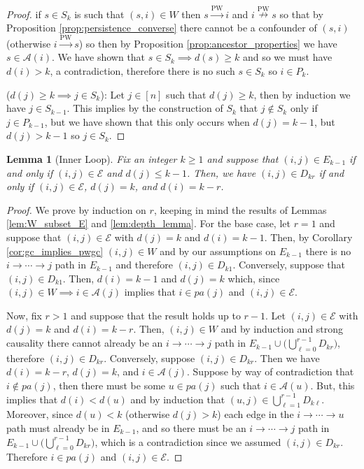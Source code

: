\documentclass{statsoc}
\newcounter{lemma}
\def\pwgc{\overset{\text{PW}}{\rightarrow}}  %
\def\npwgc{\overset{\text{PW}}{\nrightarrow}}  %
\def\gcge{\mathcal{E}}  %
\newcommand{\pa}[1]{pa(#1)}  %
\newcommand{\anc}[1]{\mathcal{A}(#1)}  %
\newcommand{\gcgpath}[2]{#1 \rightarrow \cdots \rightarrow #2}  %
\newtheorem{lemma}{Lemma}
\begin{document}
\begin{proof}
  if $s \in S_k$ is such that $(s, i) \in W$ then $s \pwgc i$ and
  $i \npwgc s$ so that by Proposition \ref{prop:persistence_converse}
  there cannot be a confounder of $(s, i)$ (otherwise $i \pwgc s$) so
  then by Proposition \ref{prop:ancestor_properties} we have
  $s \in \anc{i}$.  We have shown that $s \in S_k \implies d(s) \ge k$
  and so we must have $d(i) > k$, a contradiction, therefore there is
  no such $s \in S_k$ so $i \in P_k$.

  ($d(j) \ge k \implies j \in S_k$): Let $j \in [n]$ such that
  $d(j) \ge k$, then by induction we have $j \in S_{k - 1}$.  This
  implies by the construction of $S_k$ that $j \not\in S_k$ only if
  $j \in P_{k - 1}$, but we have shown that this only occurs when
  $d(j) = k - 1$, but $d(j) > k - 1$ so $j \in S_k$.
\end{proof}

\begin{lemma}[Inner Loop]
  \label{lem:inner_loop_lemma}
  Fix an integer $k \ge 1$ and suppose that $(i, j) \in E_{k - 1}$ if
  and only if $(i, j) \in \gcge$ and $d(j) \le k - 1$.  Then, we have
  $(i, j) \in D_{kr}$ if and only if $(i, j) \in \gcge $, $d(j) = k$,
  and $d(i) = k - r$.
\end{lemma}
\begin{proof}
  We prove by induction on $r$, keeping in mind the results of Lemmas
  \ref{lem:W_subset_E} and \ref{lem:depth_lemma}.  For the base case,
  let $r = 1$ and suppose that $(i, j) \in \gcge$ with $d(j) = k$ and
  $d(i) = k - 1$.  Then, by Corollary \ref{cor:gc_implies_pwgc}
  $(i, j) \in W$ and by our assumptions on $E_{k - 1}$ there is no
  $\gcgpath{i}{j}$ path in $E_{k - 1}$ and therefore
  $(i, j) \in D_{k1}$.  Conversely, suppose that $(i, j) \in D_{k1}$.
  Then, $d(i) = k - 1$ and $d(j) = k$ which, since
  $(i, j) \in W \implies i \in \anc{j}$ implies that $i \in \pa{j}$
  and $(i, j) \in \gcge$.

  Now, fix $r > 1$ and suppose that the result holds up to $r - 1$.
  Let $(i, j) \in \gcge$ with $d(j) = k$ and $d(i) = k - r$.  Then,
  $(i, j) \in W$ and by induction and strong causality there cannot
  already be an $\gcgpath{i}{j}$ path in
  $E_{k - 1} \cup \big(\bigcup_{\ell = 0}^{r - 1} D_{kr}\big)$,
  therefore $(i, j) \in D_{kr}$.  Conversely, suppose
  $(i, j) \in D_{kr}$.  Then we have $d(i) = k - r$, $d(j) = k$, and
  $i \in \anc{j}$.  Suppose by way of contradiction that
  $i \not\in \pa{j}$, then there must be some $u \in \pa{j}$ such that
  $i \in \anc{u}$.  But, this implies that $d(i) < d(u)$ and by
  induction that $(u, j) \in \bigcup_{\ell = 1}^{r - 1}D_{k\ell}$.
  Moreover, since $d(u) < k$ (otherwise $d(j) > k$) each edge in
  the $\gcgpath{i}{u}$ path must already be in $E_{k - 1}$, and so
  there must be an $\gcgpath{i}{j}$ path in
  $E_{k - 1}\cup\big(\bigcup_{\ell = 0}^{r - 1}D_{kr}\big)$, which is
  a contradiction since we assumed $(i, j) \in D_{kr}$.  Therefore
  $i \in \pa{j}$ and $(i, j) \in \gcge$.
\end{proof}
\end{document}
